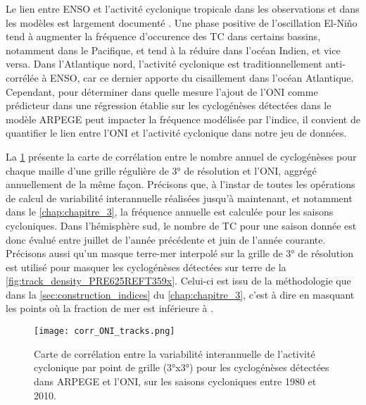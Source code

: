 \documentclass[../main.tex]{subfiles}
\begin{document}
Le lien entre ENSO et l'activité cyclonique tropicale dans les observations et dans les modèles est largement documenté
\parencite{chan_tropical_1985,wu_gcm_1992,landsea_ninosouthern_2000,mcdonald_tropical_2005,lin_enso_2020}. Une phase positive de l'oscillation El-Niño tend à
augmenter la fréquence d'occurence des TC dans certains bassins, notamment dans le Pacifique, et tend à la réduire dans l'océan Indien, et vice versa. Dans
l'Atlantique nord, l'activité cyclonique est traditionnellement anti-corrélée à ENSO, car ce dernier apporte du cisaillement dans l'océan Atlantique. Cependant,
pour déterminer dans quelle mesure l'ajout de l'ONI comme prédicteur dans une régression établie sur les cyclogénèses détectées dans le modèle ARPEGE peut
impacter la fréquence modélisée par l'indice, il convient de quantifier le lien entre l'ONI et l'activité cyclonique dans notre jeu de données.

La \cref{fig:corr_ONI_pt} présente la carte de corrélation entre le nombre annuel de cyclogénèses pour chaque maille d'une grille régulière de \ang{3} de
résolution et l'ONI, aggrégé annuellement de la même façon. Précisons que, à l'instar de toutes les opérations de calcul de variabilité interannuelle réalisées
jusqu'à maintenant, et notamment dans le \cref{chap:chapitre_3}, la fréquence annuelle est calculée pour les saisons cycloniques. Dans l'hémisphère sud, le
nombre de TC pour une saison donnée est donc évalué entre juillet de l'année précédente et juin de l'année courante. Précisons aussi qu'un masque terre-mer
interpolé sur la grille de \ang{3} de résolution est utilisé pour masquer les cyclogénèses détectées sur terre de la \cref{fig:track_density_PRE625REFT359x}.
Celui-ci est issu de la méthodologie que dans la \cref{sec:construction_indices} du \cref{chap:chapitre_3}, c'est à dire en masquant les points où la fraction
de mer est inférieure à .

\begin{figure}[tpb]
    \centering
    \texttt{[image: corr\_ONI\_tracks.png]}
    \caption{Carte de corrélation entre la variabilité interannuelle de l'activité cyclonique par point de grille (\ang{3}x\ang{3}) pour les cyclogénèses
    détectées dans ARPEGE et l'ONI, sur les saisons cycloniques entre \num{1980} et \num{2010}.}
    \label{fig:corr_ONI_pt}
\end{figure}
\end{document}
